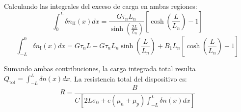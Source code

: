 \begin{problema}
Calculando las integrales del exceso de carga en ambas regiones:
\[
\int_0^L \delta n_{\text{II}}(x) dx = \frac{G \tau_n L_n}{\sinh\left(\frac{2L}{L_n}\right)} \left[ \cosh\left(\frac{L}{L_n}\right) - 1 \right]
\]
\[
\int_{-L}^0 \delta n_{\text{I}}(x) dx = G \tau_n L - G \tau_n L_n \sinh\left(\frac{L}{L_n}\right) + B_1 L_n \left[ \cosh\left(\frac{L}{L_n}\right) - 1 \right]
\]

Sumando ambas contribuciones, la carga integrada total resulta $Q_{\text{tot}} = \int_{-L}^L \delta n(x) dx$. La resistencia total del dispositivo es:
\[
R = \frac{B}{C \left[ 2 L \sigma_0 + e (\mu_n + \mu_p) \int_{-L}^L \delta n(x) dx \right]}
\]
\end{problema}

\newpage
